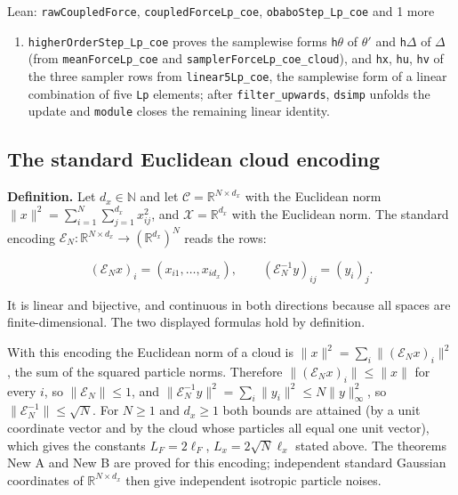 \documentclass[11pt,a4paper]{report}
\begin{document}
\begin{leanbox}{Lean: \texttt{rawCoupledForce}, \texttt{coupledForceLp\_\allowbreak{}coe}, \texttt{obaboStep\_\allowbreak{}Lp\_\allowbreak{}coe} and 1 more}
\begin{enumerate}
\item \texttt{higher\allowbreak{}Order\allowbreak{}Step\_\allowbreak{}Lp\_\allowbreak{}coe} proves the samplewise forms \texttt{h\ensuremath{\theta}} of \(\theta'\) and \texttt{h\allowbreak{}\ensuremath{\Delta}} of \(\Delta\) (from \texttt{mean\allowbreak{}Force\allowbreak{}Lp\_\allowbreak{}coe} and \texttt{sampler\allowbreak{}Force\allowbreak{}Lp\_\allowbreak{}coe\_\allowbreak{}cloud}), and \texttt{hx}, \texttt{hu}, \texttt{hv} of the three sampler rows from \texttt{linear5\allowbreak{}Lp\_\allowbreak{}coe}, the samplewise form of a linear combination of five \texttt{Lp} elements; after \texttt{filter\_\allowbreak{}upwards}, \texttt{dsimp} unfolds the update and \texttt{module} closes the remaining linear identity.

\end{enumerate}
\end{leanbox}
\subsection{\texorpdfstring{The standard Euclidean cloud encoding}{The standard Euclidean cloud encoding}}


\textbf{Definition.} Let \(d_x\in\mathbb N\) and let \(\mathcal C=\mathbb R^{N\times d_x}\) with the Euclidean norm \(\|x\|^2=\sum_{i=1}^N\sum_{j=1}^{d_x}x_{ij}^2\), and \(\mathcal X=\mathbb R^{d_x}\) with the Euclidean norm. The standard encoding \(\mathcal E_N:\mathbb R^{N\times d_x}\to(\mathbb R^{d_x})^N\) reads the rows:


\[(\mathcal E_Nx)_i=(x_{i1},\dots,x_{id_x}),\qquad (\mathcal E_N^{-1}y)_{ij}=(y_i)_j .\]


It is linear and bijective, and continuous in both directions because all spaces are finite-dimensional. The two displayed formulas hold by definition.




With this encoding the Euclidean norm of a cloud is \(\|x\|^2=\sum_i\|(\mathcal E_Nx)_i\|^2\), the sum of the squared particle norms. Therefore \(\|(\mathcal E_Nx)_i\|\le\|x\|\) for every \(i\), so \(\|\mathcal E_N\|\le1\), and \(\|\mathcal E_N^{-1}y\|^2=\sum_i\|y_i\|^2\le N\|y\|_\infty^2\), so \(\|\mathcal E_N^{-1}\|\le\sqrt N\). For \(N\ge1\) and \(d_x\ge1\) both bounds are attained (by a unit coordinate vector and by the cloud whose particles all equal one unit vector), which gives the constants \(L_F=2\ell_F\), \(L_x=2\sqrt N\ell_x\) stated above. The theorems New A and New B are proved for this encoding; independent standard Gaussian coordinates of \(\mathbb R^{N\times d_x}\) then give independent isotropic particle noises.
\end{document}
